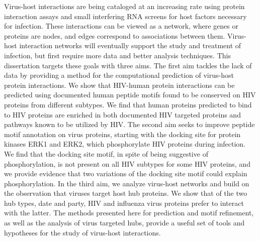 Virus-host interactions are being cataloged at an increasing rate
using protein interaction assays and small interfering RNA screens for
host factors necessary for infection. These interactions can be viewed
as a network, where genes or proteins are nodes, and edges correspond
to associations between them. Virus-host interaction networks will
eventually support the study and treatment of infection, but first
require more data and better analysis techniques. This dissertation
targets these goals with three aims. The first aim tackles the lack of
data by providing a method for the computational prediction of
virus-host protein interactions. We show that HIV-human protein
interactions can be predicted using documented human peptide motifs
found to be conserved on HIV proteins from different subtypes. We find
that human proteins predicted to bind to HIV proteins are enriched in
both documented HIV targeted proteins and pathways known to be
utilized by HIV. The second aim seeks to improve peptide motif
annotation on virus proteins, starting with the docking site for
protein kinases ERK1 and ERK2, which phosphorylate HIV proteins during
infection. We find that the docking site motif, in spite of being
suggestive of phosphorylation, is not present on all HIV subtypes for
some HIV proteins, and we provide evidence that two variations of the
docking site motif could explain phosphorylation. In the third aim, we
analyze virus-host networks and build on the observation that viruses
target host hub proteins. We show that of the two hub types, date and
party, HIV and influenza virus proteins prefer to interact with the
latter. The methods presented here for prediction and motif
refinement, as well as the analysis of virus targeted hubs, provide a
useful set of tools and hypotheses for the study of virus-host
interactions.
